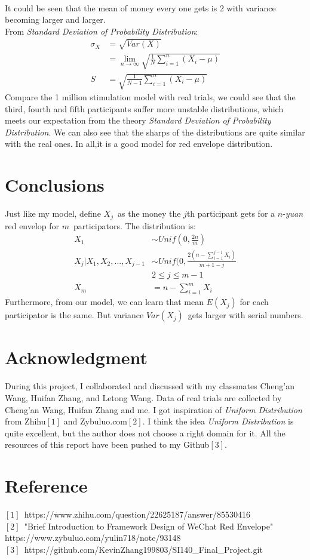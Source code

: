 \documentclass[10pt,journal]{IEEEtran}
\begin{document}
\\
It could be seen that the mean of money every one gets is 2 with variance becoming larger and larger.
\\
From \emph{Standard Deviation of Probability Distribution}:
\[
	\begin{split}
		\sigma_X&=\sqrt{Var(X)}
		\\
		&=\lim\limits_{n\rightarrow\infty}\sqrt{\frac{1}{N}\sum_{i=1}^{n}(X_i-\mu)}
		\\
		S&=\sqrt{\frac{1}{N-1}\sum_{i=1}^{n}(X_i-\mu)}
	\end{split}
\]
Compare the 1 million stimulation model with real trials, we could see that the third, fourth and fifth participants suffer more unstable distributions, which meets our expectation from the theory \emph{Standard Deviation of Probability Distribution}. We can also see that the sharps of the distributions are quite similar with the real ones. In all,it is a good model for red envelope distribution.
\section{Conclusions}
Just like my model, define \(X_j\)\ as the money the \(j\)th participant gets for a \(n\)-\emph{yuan} red envelop for \(m\)\ participators. The distribution is:
\[
	\begin{split}
		X_1&\sim Unif(0,\frac{2n}{m})
		\\
		X_j|X_1,X_2,...,X_{j-1}&\sim Unif(0,\frac{2(n-\sum_{i=1}^{j-1}X_i)}{m+1-j}
		\\
		&2\leq j\leq m-1
		\\
		X_m&=n-\sum_{i=1}^{m}X_i
	\end{split}
\] 
Furthermore, from our model, we can learn that mean \(E(X_j)\) for each participator is the same. But variance \(Var(X_j)\)\ gets larger with serial numbers.

\section*{Acknowledgment}
During this project, I collaborated and discussed with my classmates Cheng'an Wang, Huifan Zhang, and Letong Wang. Data of real trials are collected by Cheng'an Wang, Huifan Zhang and me. I got inspiration of \emph{Uniform Distribution} from Zhihu\(\left[ 1 \right]\) and Zybuluo.com\(\left[ 2 \right]\). I think the idea \emph{Uniform Distribution} is quite excellent, but the author does not choose a right domain for it. All the resources of this report have been pushed to my Github\(\left[ 3 \right]\).



%
%
\section*{Reference}
\(\left[ 1\right]\)\ https://www.zhihu.com/question/22625187/answer/85530416
\\
\(\left[ 2\right]\)\ "Brief Introduction to Framework Design of WeChat Red Envelope" https://www.zybuluo.com/yulin718/note/93148
\\
\(\left[ 3\right]\)\ https://github.com/KevinZhang199803/SI140\_Final\_Project.git
\end{document}
